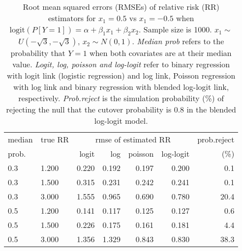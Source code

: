 \documentclass[12pt,a4paper]{article}
\begin{document}
\begin{table}[H] 
\small\sf\centering 
\caption{Root mean squared errors (RMSEs) of relative risk (RR) estimators for $x_1=0.5$ vs $x_1=-0.5$ when $\mbox{logit}(P[Y=1])=\alpha+\beta_1 x_1 + \beta_2 x_2$. Sample size is 1000. $x_1 \sim $$U(-\sqrt{3},-\sqrt{3})$, $x_2 \sim N(0,1)$. {\it Median prob} refers to the probability that $Y=1$ when both covariates are at their median value. {\it Logit, log, poisson and log-logit} refer to binary regression with logit link (logistic regression) and log link, Poisson regression with log link and binary regression with blended log-logit link, respectively. {\it Prob.reject} is the simulation probability (\%) of rejecting the null that the cutover probability is $0.8$ in the blended log-logit model.} 
\begin{tabular}{llrrrrr} 
\toprule 
median & true RR & \multicolumn{4}{c}{rmse of estimated RR} & prob.reject \\ 
prob. & & logit & log & poisson & log-logit  & (\%) \\ \midrule 
0.3 & 1.200 & 0.220 & 0.192 & 0.197 & 0.200 &  0.1 \\  
0.3 & 1.500 & 0.315 & 0.231 & 0.242 & 0.241 &  0.1 \\  
0.3 & 3.000 & 1.555 & 0.965 & 0.690 & 0.780 & 20.4 \\  
0.5 & 1.200 & 0.141 & 0.117 & 0.125 & 0.127 &  0.6 \\  
0.5 & 1.500 & 0.226 & 0.175 & 0.161 & 0.181 &  4.4 \\  
0.5 & 3.000 & 1.356 & 1.329 & 0.843 & 0.830 & 38.3 \\  
\bottomrule 
\end{tabular} 
\end{table} 
\end{document}
